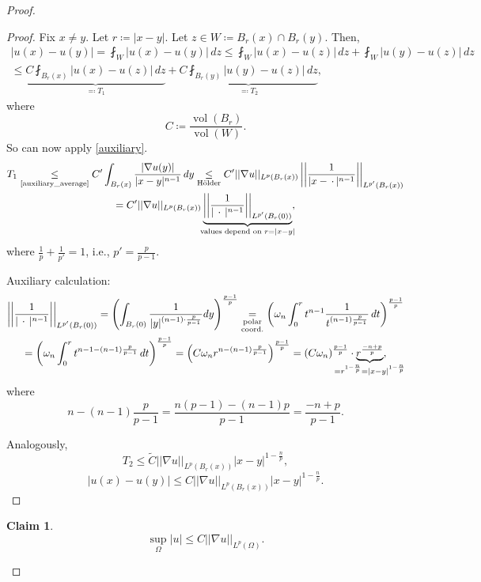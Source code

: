 \documentclass[12pt]{article}
\DeclareMathOperator{\vol}{vol}
\theoremstyle{definition}
\newtheorem*{claim*}{Claim}
\begin{document}
\begin{proof}
\begin{enumerate}[label=\alph*)]
\begin{proof}
Fix $x\neq y$. Let $r\coloneqq|x-y|$. Let $z\in W\coloneqq B_r(x)\cap B_r(y)$. Then,
\begin{multline*}
\big|u(x)-u(y)\big|=\fint_W\big|u(x)-u(y)\big|\,dz\leq\fint_W\big|u(x)-u(z)\big|\,dz+\fint_W\big|u(y)-u(z)\big|\,dz\\
\leq\underbrace{C\fint_{B_r(x)}\big|u(x)-u(z)\big|\,dz}_{\eqqcolon T_1}+\underbrace{C\fint_{B_r(y)}\big|u(y)-u(z)\big|\,dz}_{\eqqcolon T_2},
\end{multline*}
where
\[C\coloneqq\frac{\vol(B_r)}{\vol(W)}.\]
So can now apply \eqref{auxiliary}.
\begin{multline*}
T_1\underset{\text{\eqref{auxiliary_average}}}{\leq}C'\int_{B_r(x)}\frac{|\nabla u(y)|}{|x-y|^{n-1}}\,dy\underset{\text{H\"{o}lder}}{\leq}C'||\nabla u||_{L^p(B_r(x))}\left|\left|\frac{1}{|x-\,\cdot\,|^{n-1}}\right|\right|_{L^{p'}(B_r(x))}\\
=C'||\nabla u||_{L^p(B_r(x))}\underbrace{\left|\left|\frac{1}{|\,\cdot\,|^{n-1}}\right|\right|_{L^{p'}(B_r(0))}}_{\mathclap{\text{values depend on }r=|x-y|}},
\end{multline*}
where $\frac{1}{p}+\frac{1}{p'}=1$, i.e., $p'=\frac{p}{p-1}$.

Auxiliary calculation:
\begin{multline*}
\left|\left|\frac{1}{|\,\cdot\,|^{n-1}}\right|\right|_{L^{p'}(B_r(0))}=\left(\int_{B_r(0)}\frac{1}{|y|^{(n-1)\cdot\frac{p}{p-1}}}dy\right)^{\frac{p-1}{p}}\underset{\substack{\text{polar}\\\text{coord.}}}{=}\left(\omega_n\int_0^rt^{n-1}\frac{1}{t^{(n-1)\frac{p}{p-1}}}\,dt\right)^{\frac{p-1}{p}}\\
=\left(\omega_n\int_0^rt^{n-1-(n-1)\frac{p}{p-1}}\,dt\right)^{\frac{p-1}{p}}=\left(C\omega_nr^{n-(n-1)\frac{p}{p-1}}\right)^{\frac{p-1}{p}}=(C\omega_n)^{\frac{p-1}{p}}\cdot\underbrace{r^{\frac{-n+p}{p}}}_{\mathclap{=r^{1-\frac{n}{p}}=|x-y|^{1-\frac{n}{p}}}},
\end{multline*}
where
\[n-(n-1)\frac{p}{p-1}=\frac{n(p-1)-(n-1)p}{p-1}=\frac{-n+p}{p-1}.\]

Analogously,
\[T_2\leq\widetilde{C}||\nabla u||_{L^p(B_r(x))}|x-y|^{1-\frac{n}{p}},\]
\[\big|u(x)-u(y)\big|\leq C||\nabla u||_{L^p(B_r(x))}|x-y|^{1-\frac{n}{p}}.\]
\end{proof}

\begin{claim*}
\[\sup_{\Omega}|u|\leq C||\nabla u||_{L^p(\Omega)}.\]
\end{claim*}


\end{enumerate}
\end{proof}
\end{document}
